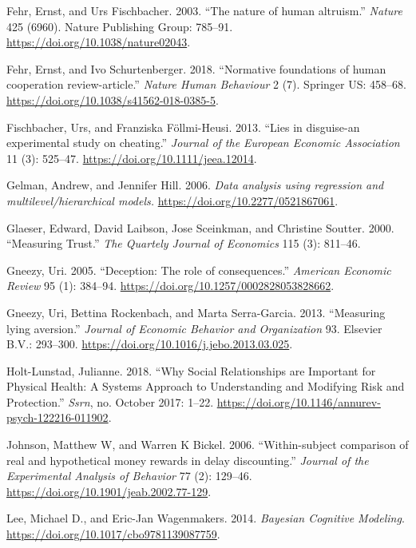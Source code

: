 \documentclass[smallextended]{svjour3}       %
\begin{document}
\leavevmode\hypertarget{ref-Fehr2003}{}%
Fehr, Ernst, and Urs Fischbacher. 2003. ``The nature of human
altruism.'' \emph{Nature} 425 (6960). Nature Publishing Group: 785--91.
\url{https://doi.org/10.1038/nature02043}.

\leavevmode\hypertarget{ref-Fehr2018}{}%
Fehr, Ernst, and Ivo Schurtenberger. 2018. ``Normative foundations of
human cooperation review-article.'' \emph{Nature Human Behaviour} 2 (7).
Springer US: 458--68. \url{https://doi.org/10.1038/s41562-018-0385-5}.

\leavevmode\hypertarget{ref-Fischbacher2013a}{}%
Fischbacher, Urs, and Franziska Föllmi-Heusi. 2013. ``Lies in
disguise-an experimental study on cheating.'' \emph{Journal of the
European Economic Association} 11 (3): 525--47.
\url{https://doi.org/10.1111/jeea.12014}.

\leavevmode\hypertarget{ref-Gelman2006}{}%
Gelman, Andrew, and Jennifer Hill. 2006. \emph{Data analysis using
regression and multilevel/hierarchical models.}
\url{https://doi.org/10.2277/0521867061}.

\leavevmode\hypertarget{ref-Glaeser2000}{}%
Glaeser, Edward, David Laibson, Jose Sceinkman, and Christine Soutter.
2000. ``Measuring Trust.'' \emph{The Quartely Journal of Economics} 115
(3): 811--46.

\leavevmode\hypertarget{ref-Gneezy2005}{}%
Gneezy, Uri. 2005. ``Deception: The role of consequences.''
\emph{American Economic Review} 95 (1): 384--94.
\url{https://doi.org/10.1257/0002828053828662}.

\leavevmode\hypertarget{ref-Gneezy2013}{}%
Gneezy, Uri, Bettina Rockenbach, and Marta Serra-Garcia. 2013.
``Measuring lying aversion.'' \emph{Journal of Economic Behavior and
Organization} 93. Elsevier B.V.: 293--300.
\url{https://doi.org/10.1016/j.jebo.2013.03.025}.

\leavevmode\hypertarget{ref-Holt-Lunstad2018}{}%
Holt-Lunstad, Julianne. 2018. ``Why Social Relationships are Important
for Physical Health: A Systems Approach to Understanding and Modifying
Risk and Protection.'' \emph{Ssrn}, no. October 2017: 1--22.
\url{https://doi.org/10.1146/annurev-psych-122216-011902}.

\leavevmode\hypertarget{ref-Johnson2006}{}%
Johnson, Matthew W, and Warren K Bickel. 2006. ``Within-subject
comparison of real and hypothetical money rewards in delay
discounting.'' \emph{Journal of the Experimental Analysis of Behavior}
77 (2): 129--46. \url{https://doi.org/10.1901/jeab.2002.77-129}.

\leavevmode\hypertarget{ref-Lee2014}{}%
Lee, Michael D., and Eric-Jan Wagenmakers. 2014. \emph{Bayesian
Cognitive Modeling}. \url{https://doi.org/10.1017/cbo9781139087759}.
\end{document}
